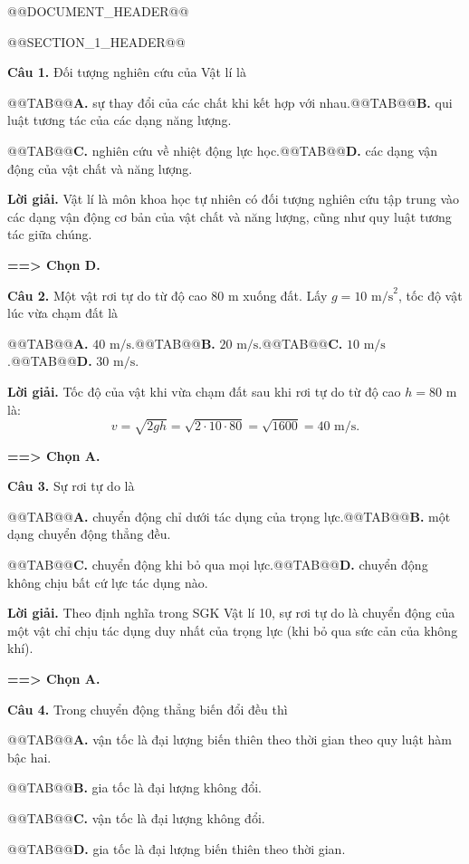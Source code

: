 \documentclass[11pt,a4paper]{article}
\begin{document}
@@DOCUMENT_HEADER@@

@@SECTION_1_HEADER@@

\textbf{Câu 1.} Đối tượng nghiên cứu của Vật lí là

@@TAB@@\textbf{A.} sự thay đổi của các chất khi kết hợp với nhau.@@TAB@@\textbf{B.} qui luật tương tác của các dạng năng lượng.

@@TAB@@\textbf{C.} nghiên cứu về nhiệt động lực học.@@TAB@@\textbf{D.} các dạng vận động của vật chất và năng lượng.

\textbf{Lời giải.} Vật lí là môn khoa học tự nhiên có đối tượng nghiên cứu tập trung vào các dạng vận động cơ bản của vật chất và năng lượng, cũng như quy luật tương tác giữa chúng.

\textbf{==> Chọn D.}

\textbf{Câu 2.} Một vật rơi tự do từ độ cao $80\text{ m}$ xuống đất. Lấy $g = 10\text{ m/s}^2$, tốc độ vật lúc vừa chạm đất là

@@TAB@@\textbf{A.} $40\text{ m/s}$.@@TAB@@\textbf{B.} $20\text{ m/s}$.@@TAB@@\textbf{C.} $10\text{ m/s}$.@@TAB@@\textbf{D.} $30\text{ m/s}$.

\textbf{Lời giải.} Tốc độ của vật khi vừa chạm đất sau khi rơi tự do từ độ cao $h = 80\text{ m}$ là:
\[
v = \sqrt{2gh} = \sqrt{2 \cdot 10 \cdot 80} = \sqrt{1600} = 40\text{ m/s}.
\]

\textbf{==> Chọn A.}

\textbf{Câu 3.} Sự rơi tự do là

@@TAB@@\textbf{A.} chuyển động chỉ dưới tác dụng của trọng lực.@@TAB@@\textbf{B.} một dạng chuyển động thẳng đều.

@@TAB@@\textbf{C.} chuyển động khi bỏ qua mọi lực.@@TAB@@\textbf{D.} chuyển động không chịu bất cứ lực tác dụng nào.

\textbf{Lời giải.} Theo định nghĩa trong SGK Vật lí 10, sự rơi tự do là chuyển động của một vật chỉ chịu tác dụng duy nhất của trọng lực (khi bỏ qua sức cản của không khí).

\textbf{==> Chọn A.}

\textbf{Câu 4.} Trong chuyển động thẳng biến đổi đều thì

@@TAB@@\textbf{A.} vận tốc là đại lượng biến thiên theo thời gian theo quy luật hàm bậc hai.

@@TAB@@\textbf{B.} gia tốc là đại lượng không đổi.

@@TAB@@\textbf{C.} vận tốc là đại lượng không đổi.

@@TAB@@\textbf{D.} gia tốc là đại lượng biến thiên theo thời gian.
\end{document}
